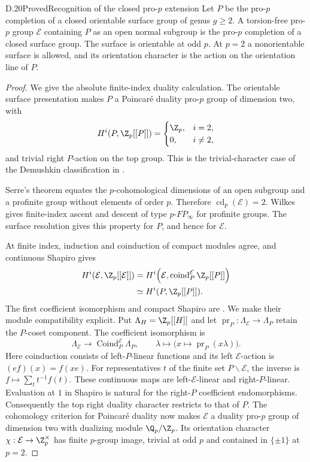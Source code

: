 \begin{claim}{D.20}{Proved}{Recognition of the closed pro-$p$ extension}
Let $P$ be the pro-$p$ completion of a closed orientable surface group of genus $g\geq2$. A torsion-free pro-$p$ group $\mathcal E$ containing $P$ as an open normal subgroup is the pro-$p$ completion of a closed surface group. The surface is orientable at odd $p$. At $p=2$ a nonorientable surface is allowed, and its orientation character is the action on the orientation line of $P$.
\end{claim}
\begin{proof}
We give the absolute finite-index duality calculation. The orientable surface presentation makes $P$ a Poincar\'e duality pro-$p$ group of dimension two, with
\[
 H^i(P,\Z_p[[P]])=
 \begin{cases}\Z_p,&i=2,\\0,&i\ne2,\end{cases}
\]
and trivial right $P$-action on the top group. This is the trivial-character case of the Demushkin classification in \cite[Theorem 1.9]{R-Wilkes}.

Serre's theorem \cite[\S1, Theorem]{R-SerreCD} equates the $p$-cohomological dimensions of an open subgroup and a profinite group without elements of order $p$. Therefore $\operatorname{cd}_p(\mathcal E)=2$. Wilkes \cite[Proposition 1.26]{R-WilkesRelative} gives finite-index ascent and descent of type $p$-$FP_\infty$ for profinite groups. The surface resolution gives this property for $P$, and hence for $\mathcal E$.

At finite index, induction and coinduction of compact modules agree, and continuous Shapiro gives
\[
\begin{split}
 H^i(\mathcal E,\Z_p[[\mathcal E]])
 &=
 H^i\!\left(\mathcal E,
        \operatorname{coind}_{P}^{\mathcal E}\Z_p[[P]]\right)\\
 &\simeq H^i(P,\Z_p[[P]]).
\end{split}
\]
The first coefficient isomorphism and compact Shapiro are \cite[Propositions 1.16 and 1.21, and the remark after 1.21]{R-WilkesRelative}. We make their module compatibility explicit. Put $\Lambda_H=\Z_p[[H]]$ and let $\operatorname{pr}_P:\Lambda_{\mathcal E}\to\Lambda_P$ retain the $P$-coset component. The coefficient isomorphism is
\[
 \Lambda_{\mathcal E}\longrightarrow\operatorname{Coind}_P^{\mathcal E}\Lambda_P,
 \qquad \lambda\longmapsto \bigl(x\mapsto\operatorname{pr}_P(x\lambda)\bigr).
\]
Here coinduction consists of left-$P$-linear functions and its left $\mathcal E$-action is $(e f)(x)=f(xe)$. For representatives $t$ of the finite set $P\backslash\mathcal E$, the inverse is $f\mapsto\sum_t t^{-1}f(t)$. These continuous maps are left-$\mathcal E$-linear and right-$P$-linear. Evaluation at $1$ in Shapiro is natural for the right-$P$ coefficient endomorphisms. Consequently the top right duality character restricts to that of $P$. The cohomology criterion for Poincar\'e duality now makes $\mathcal E$ a duality pro-$p$ group of dimension two with dualizing module $\Q_p/\Z_p$. Its orientation character $\chi:\mathcal E\to\Z_p^\times$ has finite $p$-group image, trivial at odd $p$ and contained in $\{\pm1\}$ at $p=2$.


\end{proof}
